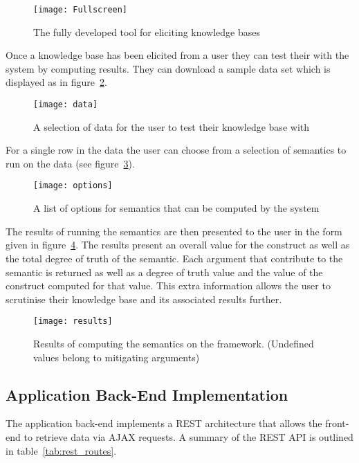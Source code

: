 \begin{figure}[!h]
\centering
\texttt{[image: Fullscreen]}
\caption{The fully developed tool for eliciting knowledge bases}
\label{fig:finalUI}
\end{figure}

Once a knowledge base has been elicited from a user they can test their with the system by computing results. They can download a sample data set which is displayed as in figure~\ref{fig:sampleData}.

\begin{figure}[!h]
\centering
\texttt{[image: data]}
\caption{A selection of data for the user to test their knowledge base with}
\label{fig:sampleData}
\end{figure}

For a single row in the data the user can choose from a selection of semantics to run on the data (see figure~\ref{fig:semantics}).

\begin{figure}[!h]
\centering
\texttt{[image: options]}
\caption{A list of options for semantics that can be computed by the system}
\label{fig:semantics}
\end{figure}

The results of running the semantics are then presented to the user in the form given in figure~\ref{fig:semantics_results}. The results present an overall value for the construct as well as the total degree of truth of the semantic. Each argument that contribute to the semantic is returned as well as a degree of truth value and the value of the construct computed for that value. This extra information allows the user to scrutinise their knowledge base and its associated results further.

\begin{figure}[!h]
\centering
\texttt{[image: results]}
\caption{Results of computing the semantics on the framework. (Undefined values belong to mitigating arguments)}
\label{fig:semantics_results}
\end{figure}

\subsection{Application Back-End Implementation}

The application back-end implements a REST architecture that allows the front-end to retrieve data via AJAX requests. A summary of the REST API is outlined in table~\ref{tab:rest_routes}.

